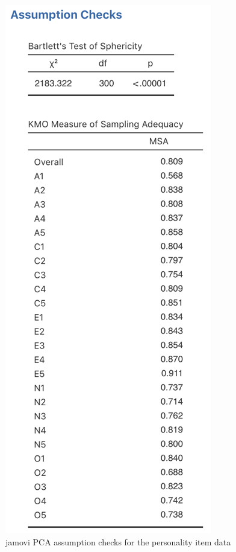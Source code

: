 \documentclass[
]{book}
\begin{document}
\begin{figure}

{\centering \includegraphics[width=1\linewidth]{img/factoranalysis/pca2} 

}

\caption{jamovi PCA assumption checks for the personality item data}\label{fig:pca2}
\end{figure}
\end{document}
